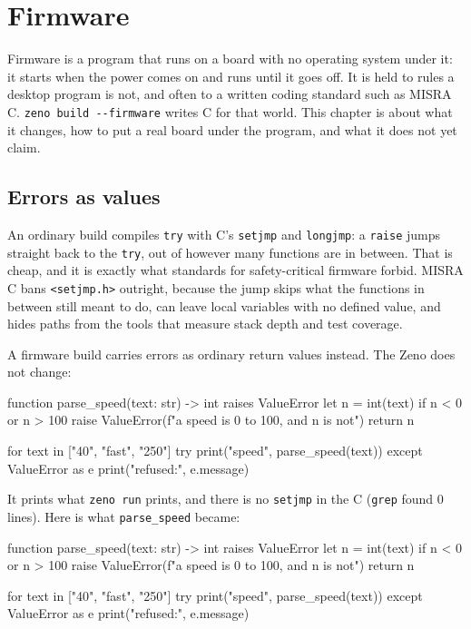 \chapter{Firmware}\label{ch-firmware}

Firmware is a program that runs on a board with no operating system
under it: it starts when the power comes on and runs until it goes
off. It is held to rules a desktop program is not, and often to a
written coding standard such as MISRA C. \verb|zeno build --firmware|
writes C for that world. This chapter is about what it changes, how to
put a real board under the program, and what it does not yet claim.

\section{Errors as values}

An ordinary build compiles \verb|try| with C's \verb|setjmp| and
\verb|longjmp|: a \verb|raise| jumps straight back to the \verb|try|,
out of however many functions are in between. That is cheap, and it is
exactly what standards for safety-critical firmware forbid. MISRA C
bans \verb|<setjmp.h>| outright, because the jump skips what the
functions in between still meant to do, can leave local variables with
no defined value, and hides paths from the tools that measure stack
depth and test coverage.

A firmware build carries errors as ordinary return values instead. The
Zeno does not change:

\begin{zeno}[file=speed.zeno, cmd=zeno build --firmware {file} ;; ./speed ;; grep setjmp speed.c | wc -l]
function parse_speed(text: str) -> int raises ValueError {
    let n = int(text)
    if n < 0 or n > 100 {
        raise ValueError(f"a speed is 0 to 100, and {n} is not")
    }
    return n
}

for text in ["40", "fast", "250"] {
    try {
        print("speed", parse_speed(text))
    } except ValueError as e {
        print("refused:", e.message)
    }
}
\end{zeno}

It prints what \verb|zeno run| prints, and there is no \verb|setjmp|
in the C (\verb|grep| found 0 lines). Here is what \verb|parse_speed|
became:

\begin{zeno}[file=speed.zeno, show=no, cmd=zeno build --firmware {file} > /dev/null ;; grep -A11 "^static bool z_parse_speed.*{$" speed.c]
function parse_speed(text: str) -> int raises ValueError {
    let n = int(text)
    if n < 0 or n > 100 {
        raise ValueError(f"a speed is 0 to 100, and {n} is not")
    }
    return n
}

for text in ["40", "fast", "250"] {
    try {
        print("speed", parse_speed(text))
    } except ValueError as e {
        print("refused:", e.message)
    }
}
\end{zeno}

